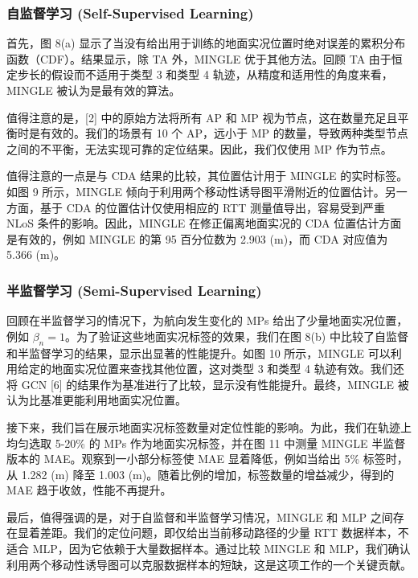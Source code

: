 \documentclass[journal]{IEEEtran}
\begin{document}
\subsubsection{自监督学习 (Self-Supervised Learning)}
首先，图 8(a) 显示了当没有给出用于训练的地面实况位置时绝对误差的累积分布函数（CDF）。结果显示，除 TA 外，MINGLE 优于其他方法。回顾 TA 由于恒定步长的假设而不适用于类型 3 和类型 4 轨迹，从精度和适用性的角度来看，MINGLE 被认为是最有效的算法。

值得注意的是，[2] 中的原始方法将所有 AP 和 MP 视为节点，这在数量充足且平衡时是有效的。我们的场景有 10 个 AP，远小于 MP 的数量，导致两种类型节点之间的不平衡，无法实现可靠的定位结果。因此，我们仅使用 MP 作为节点。

值得注意的一点是与 CDA 结果的比较，其位置估计用于 MINGLE 的实时标签。如图 9 所示，MINGLE 倾向于利用两个移动性诱导图平滑附近的位置估计。另一方面，基于 CDA 的位置估计仅使用相应的 RTT 测量值导出，容易受到严重 NLoS 条件的影响。因此，MINGLE 在修正偏离地面实况的 CDA 位置估计方面是有效的，例如 MINGLE 的第 95 百分位数为 2.903 (m)，而 CDA 对应值为 5.366 (m)。

\subsubsection{半监督学习 (Semi-Supervised Learning)}
回顾在半监督学习的情况下，为航向发生变化的 MPs 给出了少量地面实况位置，例如 $\beta_{n}=1$。为了验证这些地面实况标签的效果，我们在图 8(b) 中比较了自监督和半监督学习的结果，显示出显著的性能提升。如图 10 所示，MINGLE 可以利用给定的地面实况位置来查找其他位置，这对类型 3 和类型 4 轨迹有效。我们还将 GCN [6] 的结果作为基准进行了比较，显示没有性能提升。最终，MINGLE 被认为比基准更能利用地面实况位置。

接下来，我们旨在展示地面实况标签数量对定位性能的影响。为此，我们在轨迹上均匀选取 5-20\% 的 MPs 作为地面实况标签，并在图 11 中测量 MINGLE 半监督版本的 MAE。观察到一小部分标签使 MAE 显着降低，例如当给出 5\% 标签时，从 1.282 (m) 降至 1.003 (m)。随着比例的增加，标签数量的增益减少，得到的 MAE 趋于收敛，性能不再提升。

最后，值得强调的是，对于自监督和半监督学习情况，MINGLE 和 MLP 之间存在显着差距。我们的定位问题，即仅给出当前移动路径的少量 RTT 数据样本，不适合 MLP，因为它依赖于大量数据样本。通过比较 MINGLE 和 MLP，我们确认利用两个移动性诱导图可以克服数据样本的短缺，这是这项工作的一个关键贡献。
\end{document}

